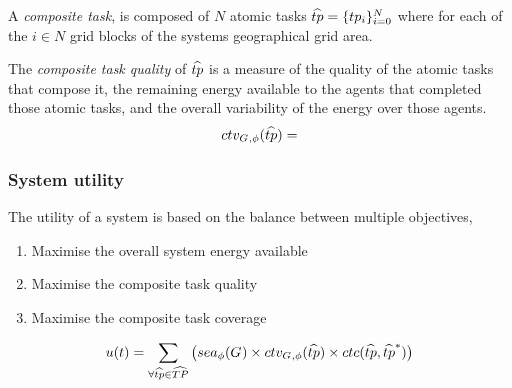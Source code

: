 \begin{definition}
	A \textit{composite task}, is composed of $N$ atomic tasks $\varCompositeTask{}{} = \lbrace \varAtomicTask{i}{} \rbrace_{i=0}^N$ where for each of the $i\in N$ grid blocks of the systems geographical grid area.
\end{definition}
\newcommand{\functionCompositeTaskQuality}[2]{
	\functionSignature{ctv_{\setAgents{}{}, \varTime{}{}}} {\varCompositeTask{}{}}
}

\begin{definition}
	The \textit{composite task quality} of $\varCompositeTask{}{}$ is a measure of the quality of the atomic tasks that compose it, the remaining energy available to the agents that completed those atomic tasks, and the overall variability of the energy over those agents. 
	\begin{equation}
		\functionCompositeTaskQuality{}{} = 
	\end{equation}
\end{definition}


\newcommand{\functionSystemUtility}[2]{u(t)}

\subsubsection{System utility}

The utility of a system is based on the balance between multiple objectives,
\begin{enumerate}
	\item Maximise the overall system energy available
	\item Maximise the composite task quality
	\item Maximise the composite task coverage
\end{enumerate}

\begin{definition}
	
	\begin{equation}
		\functionSystemUtility{}{} = \sum_{\forall \varCompositeTask{}{} \in \setCompositeTask{}{}}
		\big( 
		\functionSystemEnergyAvailable{}{}
		\times \functionCompositeTaskQuality{}{}
		\times \functionCompositeTaskCoverage{}{}
		\big)
	\end{equation}
\end{definition}

